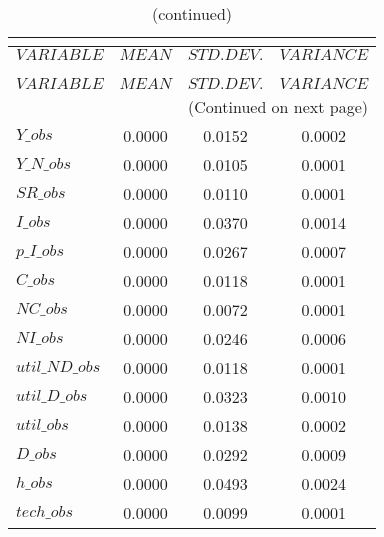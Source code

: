  
\begin{center}
\begin{longtable}{lccc} 
\caption{THEORETICAL MOMENTS}\\
 \label{Table:th_moments}\\
\toprule 
$VARIABLE       $	 & 	 $         MEAN$	 & 	 $    STD. DEV.$	 & 	 $     VARIANCE$\\
\midrule \endfirsthead 
\caption{(continued)}\\
 \toprule \\ 
$VARIABLE       $	 & 	 $         MEAN$	 & 	 $    STD. DEV.$	 & 	 $     VARIANCE$\\
\midrule \endhead 
\midrule \multicolumn{4}{r}{(Continued on next page)} \\ \bottomrule \endfoot 
\bottomrule \endlastfoot 
$Y\_obs         $	 & 	       0.0000	 & 	       0.0152	 & 	       0.0002 \\ 
$Y\_N\_obs      $	 & 	       0.0000	 & 	       0.0105	 & 	       0.0001 \\ 
$SR\_obs        $	 & 	       0.0000	 & 	       0.0110	 & 	       0.0001 \\ 
$I\_obs         $	 & 	       0.0000	 & 	       0.0370	 & 	       0.0014 \\ 
$p\_I\_obs      $	 & 	       0.0000	 & 	       0.0267	 & 	       0.0007 \\ 
$C\_obs         $	 & 	       0.0000	 & 	       0.0118	 & 	       0.0001 \\ 
$NC\_obs        $	 & 	       0.0000	 & 	       0.0072	 & 	       0.0001 \\ 
$NI\_obs        $	 & 	       0.0000	 & 	       0.0246	 & 	       0.0006 \\ 
$util\_ND\_obs  $	 & 	       0.0000	 & 	       0.0118	 & 	       0.0001 \\ 
$util\_D\_obs   $	 & 	       0.0000	 & 	       0.0323	 & 	       0.0010 \\ 
$util\_obs      $	 & 	       0.0000	 & 	       0.0138	 & 	       0.0002 \\ 
$D\_obs         $	 & 	       0.0000	 & 	       0.0292	 & 	       0.0009 \\ 
$h\_obs         $	 & 	       0.0000	 & 	       0.0493	 & 	       0.0024 \\ 
$tech\_obs      $	 & 	       0.0000	 & 	       0.0099	 & 	       0.0001 \\ 
\end{longtable}
 \end{center}
